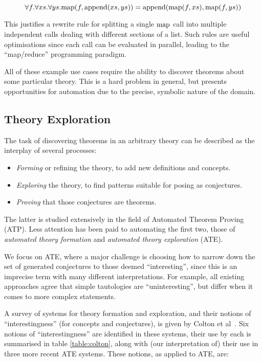\begin{equation} \label{eq:mapreduce}
  \forall f. \forall xs. \forall ys.
    \text{map}(f, \text{append}(xs, ys)) = \text{append}(\text{map}(f, xs), \text{map}(f, ys))
\end{equation}

This justifies a rewrite rule for splitting a single $\text{map}$ call into
multiple independent calls dealing with different sections of a list. Such rules
are useful optimisations since each call can be evaluated in parallel, leading
to the ``map/reduce'' programming paradigm.

All of these example use cases require the ability to discover theorems about
some particular theory. This is a hard problem in general, but presents
opportunities for automation due to the precise, symbolic nature of the domain.

\subsection{Theory Exploration}
\label{sec:te}

The task of discovering theorems in an arbitrary theory can be described as the
interplay of several processes:


\begin{itemize}
\item \emph{Forming} or refining the theory, to add new definitions and
  concepts.
\item \emph{Exploring} the theory, to find patterns suitable for posing as
  conjectures.
\item \emph{Proving} that those conjectures are theorems.
\end{itemize}

The latter is studied extensively in the field of Automated Theorem Proving
(ATP). Less attention has been paid to automating the first two, those of
\emph{automated theory formation} and \emph{automated theory exploration} (ATE).

We focus on ATE, where a major challenge is choosing how to narrow down the set
of generated conjectures to those deemed ``interesting'', since this is an
imprecise term with many different interpretations. For example, all existing
approaches agree that simple tautologies are ``uninteresting'', but differ when
it comes to more complex statements.

A survey of systems for theory formation and exploration, and their notions of
``interestingness'' (for concepts and conjectures), is given by Colton et
al~\cite{colton2000notion}. Six notions of ``interestingness'' are identified in
these systems, their use by each is summarised in table \ref{table:colton},
along with (our interpretation of) their use in three more recent ATE systems.
These notions, as applied to ATE, are:

